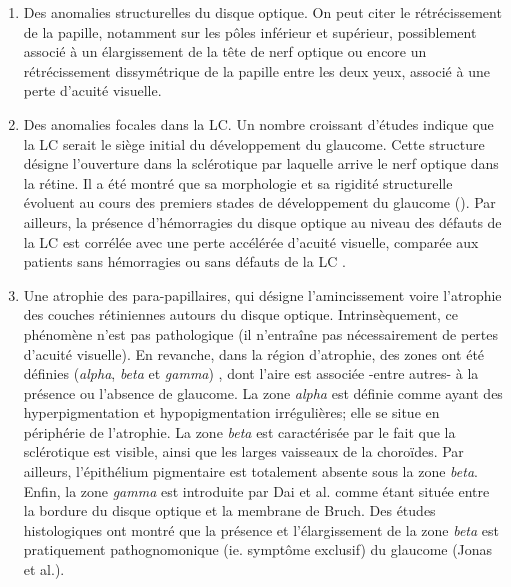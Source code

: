 \begin{enumerate}
	\item Des anomalies structurelles du disque optique. On peut citer le rétrécissement de la papille, notamment sur les pôles inférieur et supérieur, possiblement associé à un élargissement de la tête de nerf optique ou encore un rétrécissement dissymétrique de la papille entre les deux yeux, associé à une perte d'acuité visuelle. 
	\item Des anomalies focales dans la \ac{LC}. Un nombre croissant d'études indique que la \ac{LC} serait le siège initial du développement du glaucome. Cette structure désigne l'ouverture dans la sclérotique par laquelle arrive le nerf optique dans la rétine. Il a été montré que sa morphologie et sa rigidité structurelle évoluent au cours des premiers stades de développement du glaucome (\cite{downsLaminaCribrosaGlaucoma2017}). Par ailleurs, la présence d'hémorragies du disque optique au niveau des défauts de la \ac{LC} est corrélée avec une perte accélérée d'acuité visuelle, comparée aux patients sans hémorragies ou sans défauts de la \ac{LC} \cite{parkOpticDiscHemorrhage2017}.
	\item Une atrophie des para-papillaires, qui désigne l'amincissement voire l'atrophie des couches rétiniennes autours du disque optique. Intrinsèquement, ce phénomène n'est pas pathologique (il n'entraîne pas nécessairement de pertes d'acuité visuelle). En revanche, dans la région d'atrophie, des zones ont été définies (\textit{alpha}, \textit{beta} et \textit{gamma}) \cite{daiMicrostructureParapapillaryAtrophy2013a}, dont l'aire est associée -entre autres- à la présence ou l'absence de glaucome. La zone \textit{alpha} est définie comme ayant des hyperpigmentation et hypopigmentation irrégulières; elle se situe en périphérie de l'atrophie. La zone \textit{beta} est caractérisée par le fait que la sclérotique est visible, ainsi que les larges vaisseaux de la choroïdes. Par ailleurs, l'épithélium pigmentaire est totalement absente sous la zone \textit{beta}. Enfin, la zone \textit{gamma} est introduite par Dai et al. \cite{daiMicrostructureParapapillaryAtrophy2013a} comme étant située entre la bordure du disque optique et la membrane de Bruch. Des études histologiques ont montré que la présence et l'élargissement de la zone \textit{beta} est pratiquement pathognomonique (ie. symptôme exclusif) du glaucome (Jonas et al.\cite{jonasFactsMythsCerebrospinal2015}).
\end{enumerate}

